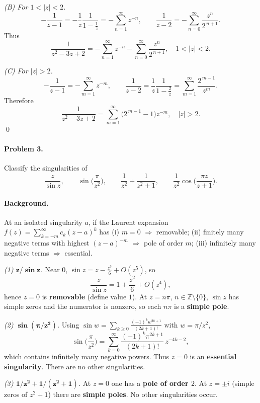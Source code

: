 \documentclass[11pt,a4paper]{article}
\theoremstyle{definition}
\theoremstyle{definition}
\theoremstyle{plain}
\theoremstyle{remark}
\begin{document}
\medskip
\emph{(B) For $1<|z|<2$.}
\[
-\frac{1}{z-1}=-\frac{1}{z}\frac{1}{1-\frac{1}{z}}
=-\sum_{n=1}^{\infty} z^{-n},\qquad
\frac{1}{z-2}=-\sum_{n=0}^{\infty}\frac{z^{n}}{2^{\,n+1}}.
\]
Thus
\[
\boxed{\ \frac{1}{z^{2}-3z+2}
	=-\sum_{n=1}^{\infty} z^{-n}-\sum_{n=0}^{\infty}\frac{z^{n}}{2^{\,n+1}},
	\quad 1<|z|<2.\ }
\]

\medskip
\emph{(C) For $|z|>2$.}
\[
-\frac{1}{z-1}=-\sum_{m=1}^{\infty} z^{-m},\qquad
\frac{1}{z-2}=\frac{1}{z}\frac{1}{1-\frac{2}{z}}
=\sum_{m=1}^{\infty}\frac{2^{\,m-1}}{z^{m}}.
\]
Therefore
\[
\boxed{\ \frac{1}{z^{2}-3z+2}
	=\sum_{m=1}^{\infty}\big(2^{\,m-1}-1\big)z^{-m},\quad |z|>2.\ }
\]
\qed

\paragraph{Problem 3.}
Classify the singularities of
\[
\frac{z}{\sin z},\qquad
\sin\!\Big(\frac{\pi}{z^{2}}\Big),\qquad
\frac{1}{z^{2}}+\frac{1}{z^{2}+1},\qquad
\frac{1}{z^{2}}\cos\!\Big(\frac{\pi z}{z+1}\Big).
\]

\paragraph{Background.}
At an isolated singularity $a$, if the Laurent expansion
$f(z)=\sum_{k=-m}^{\infty} c_k (z-a)^k$ has
(i) $m=0$ $\Rightarrow$ removable;
(ii) finitely many negative terms with highest $(z-a)^{-m}$ $\Rightarrow$ pole of order $m$;
(iii) infinitely many negative terms $\Rightarrow$ essential.

\medskip
\emph{(1) $\boldsymbol{z/\sin z}$.}
Near $0$, $\sin z=z-\frac{z^{3}}{6}+O(z^{5})$, so
\[
\frac{z}{\sin z}=1+\frac{z^{2}}{6}+O(z^{4}),
\]
hence $z=0$ is \textbf{removable} (define value $1$). At $z=n\pi$, $n\in\mathbb Z\setminus\{0\}$,
$\sin z$ has simple zeros and the numerator is nonzero, so each $n\pi$ is a \textbf{simple pole}.

\medskip
\emph{(2) $\boldsymbol{\sin(\pi/z^{2})}$.}
Using $\sin w=\sum_{k\ge0}\frac{(-1)^k w^{2k+1}}{(2k+1)!}$ with $w=\pi/z^{2}$,
\[
\sin\!\Big(\frac{\pi}{z^{2}}\Big)=\sum_{k=0}^{\infty}\frac{(-1)^k \pi^{2k+1}}{(2k+1)!}\,z^{-4k-2},
\]
which contains infinitely many negative powers. Thus $z=0$ is an \textbf{essential singularity}.
There are no other singularities.

\medskip
\emph{(3) $\boldsymbol{1/z^{2} + 1/(z^{2}+1)}$.}
At $z=0$ one has a \textbf{pole of order $2$}. At $z=\pm i$ (simple zeros of $z^{2}+1$) there are
\textbf{simple poles}. No other singularities occur.
\end{document}
